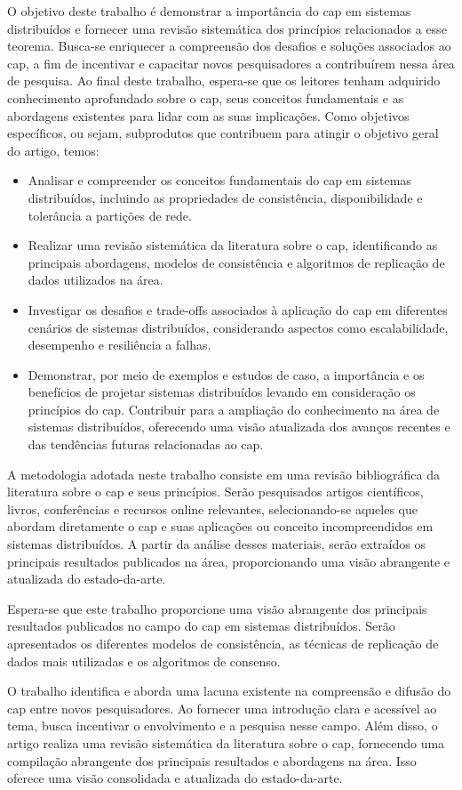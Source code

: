 O objetivo deste trabalho é demonstrar a importância do \gls{cap} em sistemas distribuídos e fornecer uma revisão sistemática dos princípios relacionados a esse teorema. Busca-se enriquecer a compreensão dos desafios e soluções associados ao \gls{cap}, a fim de incentivar e capacitar novos pesquisadores a contribuírem nessa área de pesquisa. Ao final deste trabalho, espera-se que os leitores tenham adquirido conhecimento aprofundado sobre o \gls{cap}, seus conceitos fundamentais e as abordagens existentes para lidar com as suas implicações. Como objetivos específicos, ou sejam, subprodutos que contribuem para atingir o objetivo geral do artigo, temos:
\begin{itemize}
    \item Analisar e compreender os conceitos fundamentais do \gls{cap} em sistemas distribuídos, incluindo as propriedades de consistência, disponibilidade e tolerância a partições de rede.
    \item Realizar uma revisão sistemática da literatura sobre o \gls{cap}, identificando as principais abordagens, modelos de consistência e algoritmos de replicação de dados utilizados na área.
    \item Investigar os desafios e trade-offs associados à aplicação do \gls{cap} em diferentes cenários de sistemas distribuídos, considerando aspectos como escalabilidade, desempenho e resiliência a falhas.
    \item Demonstrar, por meio de exemplos e estudos de caso, a importância e os benefícios
de projetar sistemas distribuídos levando em consideração os princípios do \gls{cap}.
Contribuir para a ampliação do conhecimento na área de sistemas distribuídos, oferecendo uma visão atualizada dos avanços recentes e das tendências futuras relacionadas ao \gls{cap}.
\end{itemize}

A metodologia adotada neste trabalho consiste em uma revisão bibliográfica da literatura sobre o \gls{cap} e seus princípios. Serão pesquisados artigos científicos, livros, conferências e recursos online relevantes, selecionando-se aqueles que abordam diretamente o \gls{cap} e suas aplicações ou conceito incompreendidos em sistemas distribuídos. A partir da análise desses materiais, serão extraídos os principais resultados publicados na área, proporcionando uma visão abrangente e atualizada do estado-da-arte.


Espera-se que este trabalho proporcione uma visão abrangente dos principais resultados publicados no campo do \gls{cap} em sistemas distribuídos. Serão apresentados os diferentes modelos de consistência, as técnicas de replicação de dados mais utilizadas e os algoritmos de consenso.

O trabalho identifica e aborda uma lacuna existente na compreensão e difusão do \gls{cap} entre novos pesquisadores. Ao fornecer uma introdução clara e acessível ao tema, busca incentivar o envolvimento e a pesquisa nesse campo. Além disso, o artigo realiza uma revisão sistemática da literatura sobre o \gls{cap}, fornecendo uma compilação abrangente dos principais resultados e abordagens na área. Isso oferece uma visão consolidada e atualizada do estado-da-arte.